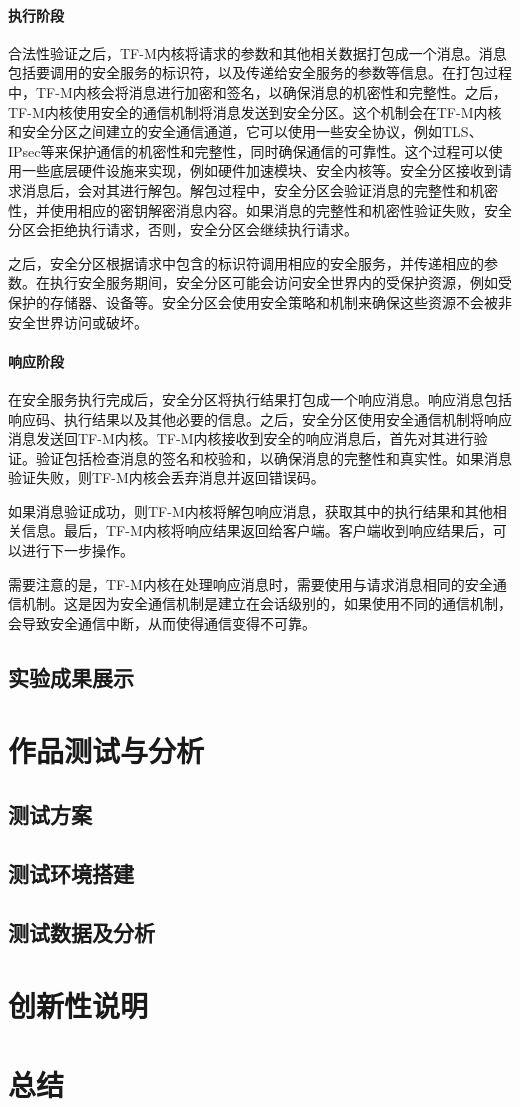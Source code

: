 \documentclass[12pt,a4paper]{ctexart}
\begin{document}
\paragraph{执行阶段}
\par 合法性验证之后，TF-M内核将请求的参数和其他相关数据打包成一个消息。消息包括要调用的安全服务的标识符，以及传递给安全服务的参数等信息。在打包过程中，TF-M内核会将消息进行加密和签名，以确保消息的机密性和完整性。之后，TF-M内核使用安全的通信机制将消息发送到安全分区。这个机制会在TF-M内核和安全分区之间建立的安全通信通道，它可以使用一些安全协议，例如TLS、IPsec等来保护通信的机密性和完整性，同时确保通信的可靠性。这个过程可以使用一些底层硬件设施来实现，例如硬件加速模块、安全内核等。安全分区接收到请求消息后，会对其进行解包。解包过程中，安全分区会验证消息的完整性和机密性，并使用相应的密钥解密消息内容。如果消息的完整性和机密性验证失败，安全分区会拒绝执行请求，否则，安全分区会继续执行请求。
\par 之后，安全分区根据请求中包含的标识符调用相应的安全服务，并传递相应的参数。在执行安全服务期间，安全分区可能会访问安全世界内的受保护资源，例如受保护的存储器、设备等。安全分区会使用安全策略和机制来确保这些资源不会被非安全世界访问或破坏。
\paragraph{响应阶段}
\par 在安全服务执行完成后，安全分区将执行结果打包成一个响应消息。响应消息包括响应码、执行结果以及其他必要的信息。之后，安全分区使用安全通信机制将响应消息发送回TF-M内核。TF-M内核接收到安全的响应消息后，首先对其进行验证。验证包括检查消息的签名和校验和，以确保消息的完整性和真实性。如果消息验证失败，则TF-M内核会丢弃消息并返回错误码。
\par 如果消息验证成功，则TF-M内核将解包响应消息，获取其中的执行结果和其他相关信息。最后，TF-M内核将响应结果返回给客户端。客户端收到响应结果后，可以进行下一步操作。
\par 需要注意的是，TF-M内核在处理响应消息时，需要使用与请求消息相同的安全通信机制。这是因为安全通信机制是建立在会话级别的，如果使用不同的通信机制，会导致安全通信中断，从而使得通信变得不可靠。

\subsection{实验成果展示}
\section{作品测试与分析}
\subsection{测试方案}
\subsection{测试环境搭建}
\subsection{测试数据及分析}
\section{创新性说明}
\section{总结}
\clearpage
\pagestyle{refStyle}


\end{document}
